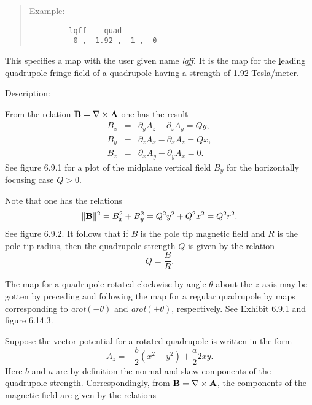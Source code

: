 \vspace{5mm}
\begin{quotation}
\noindent Example:
\begin{verbatim}
         lqff    quad
          0 ,  1.92 ,  1 ,  0
\end{verbatim}
\end{quotation}
This specifies a map with the user given name {\em lqff}.  It is the map for the
\underline leading \underline quadrupole \underline fringe \underline field of a quadrupole having a strength of 1.92 Tesla/meter.

\pagebreak

\vspace{5mm}
     Description:
\vspace{2mm}

\nopagebreak
     From the relation ${\bf B} = \nabla \times {\bf A}$ one has the result
\begin{eqnarray*}
B_x &=& \partial_y A_z - \partial_z A_y = Qy,\\
B_y &=& \partial_z A_x - \partial_x A_z = Qx,\\
B_z &=& \partial_x A_y - \partial_y A_x = 0.
\end{eqnarray*}
See figure 6.9.1 for a plot of the midplane vertical field $B_y$ for the horizontally focusing case $Q>0$.

   Note that one has the relations
\[ \|{\bf B}\|^2 = B_x^2 + B_y^2 = Q^2 y^2 + Q^2 x^2 = Q^2 r^2.\]
See figure 6.9.2.  It follows that if $B$ is the pole tip magnetic field and $R$ is the pole tip radius, then the quadrupole strength $Q$ is given by the relation
\[Q=\frac{B}{R}.\]

   The map for a quadrupole rotated clockwise by angle $\theta$ about the
   $z$-axis may be gotten by preceding and following the map for a
   regular quadrupole by maps corresponding to {\em arot\/}$(-\theta)$ and {\em arot\/}$(+\theta)$, respectively.  See Exhibit 6.9.1 and figure 6.14.3.

   Suppose the vector potential for a rotated quadrupole is written in the form
\[ A_z = -\frac{b}{2}(x^2-y^2) + \frac{a}{2}2xy. \]
Here $b$ and $a$ are by definition the normal and skew components of the
quadrupole strength.  Correspondingly, from ${\bf B} = \nabla \times
{\bf A}$, the components of the magnetic field are given by the relations

